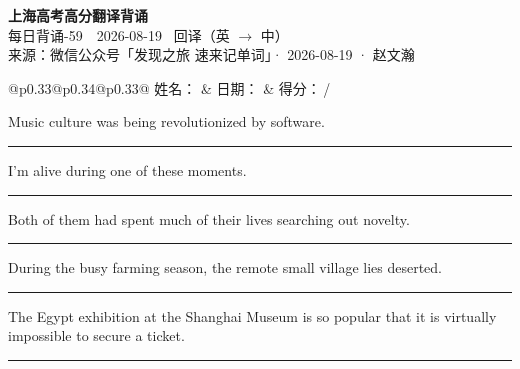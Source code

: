 \documentclass[11pt,a4paper]{article}
\newcommand{\num}[1]{\makebox[1.9em][r]{#1.}\hspace{0.3em}}
\newcommand{\wline}{\noindent\rule{\linewidth}{0.4pt}}
\begin{document}
\pagestyle{plain}
\begin{center}
{\LARGE\bfseries 上海高考高分翻译背诵 }\\[0.25em]
{\large 每日背诵-59　2026-08-19 \quad\ 回译（英 $\to$ 中）}\\[0.35em]
{\footnotesize 来源：微信公众号「发现之旅 速来记单词」· 2026-08-19 · 赵文瀚}
\end{center}

\vspace{0.4em}
\noindent\begin{tabular}{@{}p{0.33\textwidth}@{}p{0.34\textwidth}@{}p{0.33\textwidth}@{}}
姓名：\underline{\hspace{2.0cm}} & 日期：\underline{\hspace{2.0cm}} & 得分：\underline{\hspace{1.4cm}}\,/ \\
\end{tabular}

\vspace{0.5em}

\vspace{0.8em}
\num{1}Music culture was being revolutionized by software.

\vspace{0.25em}

\wline

\num{2}I'm alive during one of these moments.

\vspace{0.25em}

\wline

\num{3}Both of them had spent much of their lives searching out novelty.

\vspace{0.25em}

\wline

\num{4}During the busy farming season, the remote small village lies deserted.

\vspace{0.25em}

\wline

\num{5}The Egypt exhibition at the Shanghai Museum is so popular that it is virtually impossible to secure a ticket.

\vspace{0.25em}

\wline
\end{document}
